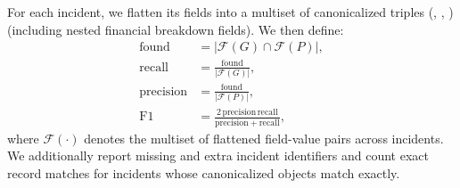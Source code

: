 For each incident, we flatten its fields into a multiset of canonicalized triples (, , ) (including nested financial breakdown fields). We then define:
\begin{align}
\mathrm{found} &= |\mathcal{F}(G) \cap \mathcal{F}(P)|,\\
\mathrm{recall} &= \frac{\mathrm{found}}{|\mathcal{F}(G)|},\\
\mathrm{precision} &= \frac{\mathrm{found}}{|\mathcal{F}(P)|},\\
\mathrm{F1} &= \frac{2\,\mathrm{precision}\,\mathrm{recall}}{\mathrm{precision}+\mathrm{recall}},
\end{align}
where $\mathcal{F}(\cdot)$ denotes the multiset of flattened field-value pairs across incidents. We additionally report missing and extra incident identifiers and count exact record matches for incidents whose canonicalized objects match exactly.
%
